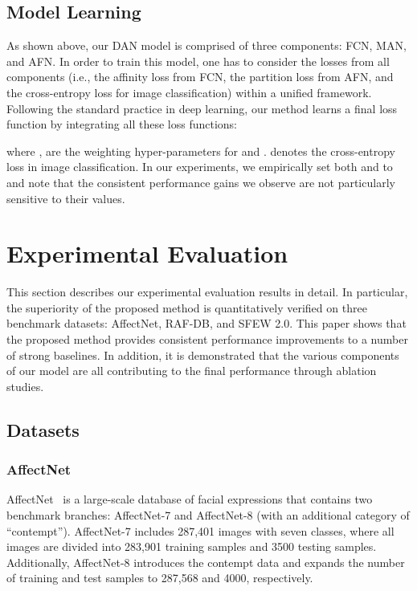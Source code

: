 \documentclass{article}
\begin{document}

\subsection{Model Learning}
As shown above, our DAN model is comprised of three components: FCN, MAN, and AFN. In order to train this model, one has to consider the losses from all components (i.e., the affinity loss from FCN, the partition loss from AFN, and the cross-entropy loss for image classification) within a unified framework. Following the standard practice in deep learning, our method learns a final loss function by integrating all these loss functions:


\noindent where ,  are the weighting hyper-parameters for  and .  denotes the cross-entropy loss in image classification. {In our experiments, we empirically set both  and  to  and note that the consistent performance gains we observe are not particularly sensitive to their values.}


\section{Experimental Evaluation}
\label{sec:exp}

{This section describes} our experimental evaluation results in detail. {In particular, the superiority of the proposed method is quantitatively verified} on three benchmark datasets: AffectNet, RAF-DB, and SFEW 2.0. This paper shows that the proposed method provides consistent performance improvements to a number of strong baselines. In addition, {it is demonstrated} that the various components of our model are all contributing to the final performance through ablation studies.

\subsection{Datasets}

\subsubsection{AffectNet} 
AffectNet~\cite{dhall2012collecting} is a large-scale database of facial expressions that contains two benchmark branches: AffectNet-7 and AffectNet-8 (with an additional category of ``contempt''). AffectNet-7 includes 287,401 images with seven classes, where all images are divided into 283,901 training samples and 3500 testing samples. Additionally, AffectNet-8 introduces the contempt data and expands the number of training and test samples to 287,568 and 4000, respectively.
\end{document}
